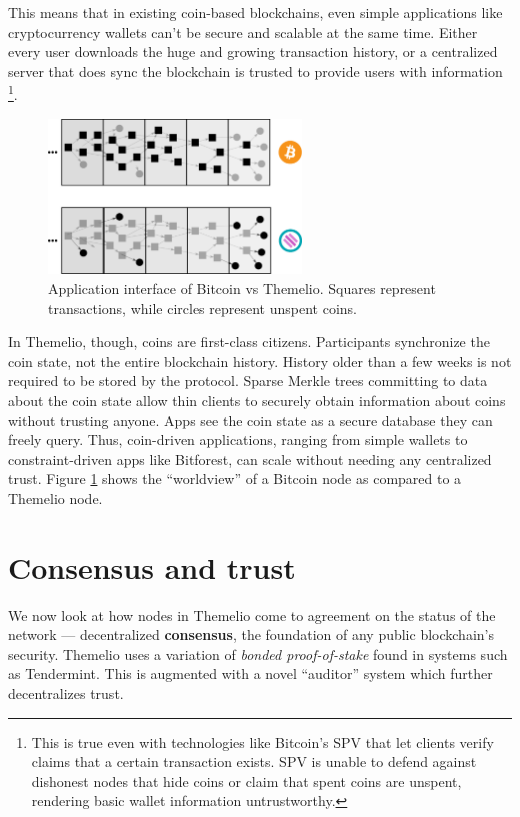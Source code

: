\documentclass[headinclude,12pt]{scrbook}
\begin{document}
This means that in existing coin-based blockchains, even simple applications like cryptocurrency wallets can't be secure and scalable at the same time. Either every user downloads the huge and growing transaction history, or a centralized server that does sync the blockchain is trusted to provide users with information \footnote{This is true even with technologies like Bitcoin's SPV that let clients verify claims that a certain transaction exists. SPV is unable to defend against dishonest nodes that hide coins or claim that spent coins are unspent, rendering basic wallet information untrustworthy.}.

\begin{figure}
    \centering
    \includegraphics[width=0.6\textwidth]{coinint.eps}
    \caption{Application interface of Bitcoin vs Themelio. Squares represent transactions, while circles represent unspent coins.}
    \label{fig:coinint}
\end{figure}

In Themelio, though, coins are first-class citizens. Participants synchronize the coin state, not the entire blockchain history. History older than a few weeks is not required to be stored by the protocol. Sparse Merkle trees committing to data about the coin state allow thin clients to securely obtain information about coins without trusting anyone. Apps see the coin state as a secure database they can freely query. Thus, coin-driven applications, ranging from simple wallets to constraint-driven apps like Bitforest, can scale without needing any centralized trust. Figure \ref{fig:coinint} shows the ``worldview'' of a Bitcoin node as compared to a Themelio node.

\section{Consensus and trust} \label{ss:consensus}

We now look at how nodes in Themelio come to agreement on the status of the network --- decentralized \textbf{consensus}, the foundation of any public blockchain's security. Themelio uses a variation of \emph{bonded proof-of-stake} found in systems such as Tendermint. This is augmented with a novel ``auditor'' system which further decentralizes trust.
\end{document}
